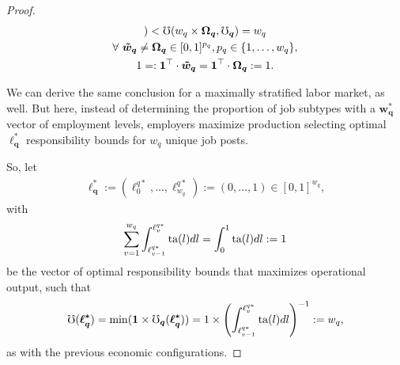 \documentclass[hidelinks, nonatbib]{elsarticle}
\begin{document}
\begin{lemma}
\begin{proof}
\begin{gather}
            )
            < 
            \mho(
                w_{q}
                \times
                \boldsymbol{\Omega_{q}},
                \boldsymbol{\mho_q}
            ) 
            = w_q
            \\
            \forall
            \
            \boldsymbol{\tilde{w}_{q}}
            \neq
            \boldsymbol{\Omega_{q}}
            \in
            [0,1]^{p_q}
            ,
            p_q \in \{1, \dots, w_q\}
            ,
            \\
            1 =:
            \boldsymbol{1} ^ {\top}
            \cdot
            \boldsymbol{\tilde{w}_{q}}
            =
            \boldsymbol{1} ^ {\top}
            \cdot
            \boldsymbol{\Omega_{q}}
            := 1
            .
        \end{gather}
        
        We can derive the same conclusion for a maximally stratified labor market, as well. But here, instead of determining the proportion of job subtypes with a $\boldsymbol{w_{q}^{*}}$ vector of employment levels, employers maximize production selecting optimal $\boldsymbol{\ell_{q}^{*}}$ responsibility bounds for $w_q$ unique job posts.
        
        So, let 
        \begin{gather}
            \boldsymbol{\ell_{q}^{*}}
            :=
            (\ell_{0}^{q*}, \dots, \ell_{w_q}^{q*})
            :=
            (0, \dots, 1) 
            \in [0,1]^{w_q}
            ,
        \end{gather}
        with
        \begin{gather}
        \sum_{v=1}^{w_q}
        \int_{
            \ell_{v-1}^{q*}
        }^{
            \ell_{v}^{q*}
        }
        \text{ta}(l)dl
        =
        \int_{0}^{1}
        \text{ta}(l)dl
        :=
        1
        \end{gather}
        be the vector of optimal responsibility bounds that maximizes operational output, such that
        \begin{gather}
            \mho(\boldsymbol{\ell_{q}^{*}})
            =
            \min(
                \boldsymbol{1}
                \times
                \boldsymbol{\mho_q}(
                    \boldsymbol{\ell_{q}^{*}}
                )
            )
            =
            1
            \times
            \left(
                \int_{
                    \ell_{v-1}^{q*}
                }^{
                    \ell_{v}^{q*}
                }
                \text{ta}(l)dl
            \right) ^ {-1}
            :=
            w_q
            ,
        \end{gather}
        as with the previous economic configurations.
        

\end{proof}
\end{lemma}
\end{document}
